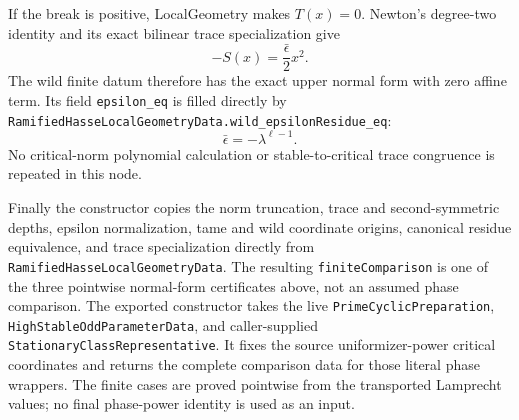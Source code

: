 \begin{theorem}
If the break is positive, LocalGeometry makes $T(x)=0$.  Newton's
degree-two identity and its exact bilinear trace specialization give
\[
 -S(x)=\frac{\bar\epsilon}{2}x^2.
\]
The wild finite datum therefore has the exact upper normal form with zero
affine term.  Its field \texttt{epsilon\_eq} is filled directly by
\texttt{RamifiedHasseLocalGeometryData.wild\_epsilonResidue\_eq}:
\[
 \bar\epsilon=-\lambda^{\ell-1}.
\]
No critical-norm polynomial calculation or stable-to-critical trace
congruence is repeated in this node.

Finally the constructor copies the norm truncation, trace and
second-symmetric depths, epsilon normalization, tame and wild coordinate
origins, canonical residue equivalence, and trace specialization directly
from \texttt{RamifiedHasseLocalGeometryData}.  The resulting
\texttt{finiteComparison} is one of the three pointwise normal-form
certificates above, not an assumed phase comparison.
\leanok
{}
\FormalizationContract
The exported constructor takes the live \texttt{PrimeCyclicPreparation},
\texttt{HighStableOddParameterData}, and caller-supplied
\texttt{StationaryClassRepresentative}.  It fixes the source
uniformizer-power critical coordinates and returns the complete comparison
data for those literal phase wrappers.  The finite cases are proved
pointwise from the transported Lamprecht values; no final phase-power
identity is used as an input.
\end{theorem}
